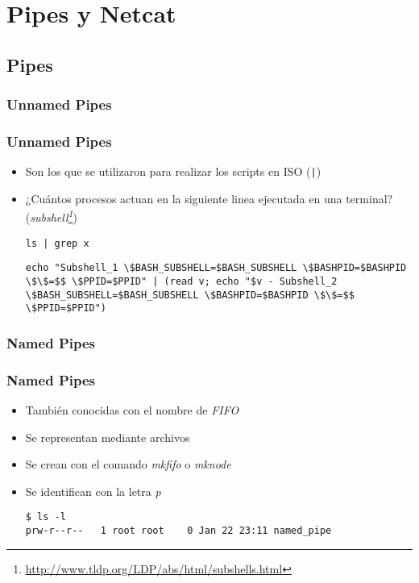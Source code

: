 \section{Pipes y Netcat}
\subsection{Pipes}

\subsubsection{Unnamed Pipes}
\begin{frame}[fragile]
  \frametitle{Unnamed Pipes}
  \begin{itemize}
    \item Son los que se utilizaron para realizar los scripts en ISO (\texttt{|})
    \item ¿Cuántos procesos actuan en la siguiente linea ejecutada en una terminal? (\textit{subshell\footnote{\url{http://www.tldp.org/LDP/abs/html/subshells.html}}})
    \begin{lstlisting}
ls | grep x
    \end{lstlisting}
    \pause
    \begin{lstlisting}
echo "Subshell_1 \$BASH_SUBSHELL=$BASH_SUBSHELL \$BASHPID=$BASHPID \$\$=$$ \$PPID=$PPID" | (read v; echo "$v - Subshell_2 \$BASH_SUBSHELL=$BASH_SUBSHELL \$BASHPID=$BASHPID \$\$=$$ \$PPID=$PPID")
    \end{lstlisting}
  \end{itemize}
\end{frame}

\subsubsection{Named Pipes}
\begin{frame}[fragile]
  \frametitle{Named Pipes}
  \begin{itemize}
    \item También conocidas con el nombre de \textit{FIFO}
    \item Se representan mediante archivos
    \item Se crean con el comando \textit{mkfifo} o \textit{mknode}
    \item Se identifican con la letra \textit{p}
    \begin{lstlisting}
$ ls -l
prw-r--r--   1 root root    0 Jan 22 23:11 named_pipe
    \end{lstlisting}
  \end{itemize}
\end{frame}

